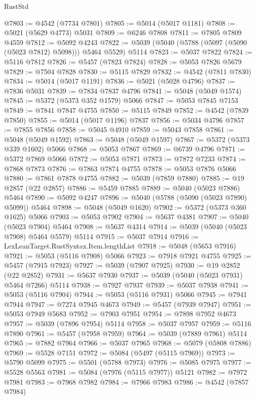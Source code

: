\begin{lexlean}{RustStd}
\begin{coremodule}
@7803 := @4542 (@7734 @7801)
@7805 := @5014 (@5017 @1181)
@7808 := @5021 (@5629 @4773) @5031
@7809 := @6246 @7808
@7811 := @7805 @7809 @4559
@7812 := @5092 @4243
@7822 := @5039 (@5040 (@5788 (@5097 (@5090 (@5023 @7812) @5098))) @5464 @5529) @5114
@7823 := @5037 @7822
@7824 := @5116 @7812
@7826 := @5457 (@7823 @7824)
@7828 := @5053 @7826 @5679
@7829 := @7504 @7828
@7830 := @5115 @7829
@7832 := @4542 (@7811 @7830)
@7834 := @5014 (@5017 @1191)
@7836 := @5021 (@5028 @4796)
@7837 := @7836 @5031
@7839 := @7834 @7837 @4796
@7841 := @5048 (@5049 @1574)
@7845 := @5372 (@5373 @352 @1579) @5066
@7847 := @5053 @7845 @7153
@7849 := @7841 @7847 @4755
@7850 := @5115 @7849
@7852 := @4542 (@7839 @7850)
@7855 := @5014 (@5017 @1196) @7837
@7856 := @5034 @4796
@7857 := @7855 @7856
@7858 := @5045 @4910
@7859 := @5043 @7858
@7861 := @5048 (@5049 @1592)
@7863 := @5048 (@5049 @1597)
@7867 := @5372 (@5373 @339 @1602) @5066
@7868 := @5053 @7867
@7869 := @6739 @4796
@7871 := @5372 @7869 @5066
@7872 := @5053 @7871
@7873 := @7872 @7233
@7874 := @7868 @7873
@7876 := @7863 @7874 @4755
@7878 := @5053 @7876 @5066
@7880 := @7861 @7878 @4755
@7882 := @5039 (@7859 @7880)
@7885 := @19 @2857 (@22 @2857)
@7886 := @5459 @7885
@7889 := @5040 (@5023 @7886) @5464
@7890 := @5092 @4247
@7896 := @5040 (@5788 (@5090 (@5023 @7890) @5099)) @5464
@7898 := @5048 (@5049 @1620)
@7902 := @5372 (@5373 @360 @1625) @5066
@7903 := @5053 @7902
@7904 := @5637 @4381
@7907 := @5040 (@5023 @7904) @5464
@7908 := @5637 @4314
@7914 := @5039 (@5040 (@5023 @7908) @5464 @5579) @5114
@7915 := @5037 @7914
@7916 := LexLeanTarget.RustSyntax.Item.lengthList
@7918 := @5048 (@5653 @7916)
@7921 := @5053 (@5116 @7908) @5066
@7923 := @7918 @7921 @4755
@7925 := @5457 (@7915 @7923)
@7927 := @5039 (@7907 @7925)
@7930 := @19 @2852 (@22 @2852)
@7931 := @5637 @7930
@7937 := @5039 (@5040 (@5023 @7931) @5464 @7266) @5114
@7938 := @7927 @7937
@7939 := @5037 @7938
@7941 := @5053 (@5116 @7904)
@7944 := @5053 (@5116 @7931) @5066
@7945 := @7941 @7944
@7947 := @7274 @7945 @4673
@7949 := @5457 (@7939 @7947)
@7951 := @5053 @7949 @5683
@7952 := @7903 @7951
@7954 := @7898 @7952 @4673
@7957 := @5039 (@7896 @7954) @5114
@7958 := @5037 @7957
@7959 := @5116 @7890
@7961 := @5457 (@7958 @7959)
@7964 := @5039 (@7889 @7961) @5114
@7965 := @7882 @7964
@7966 := @5037 @7965
@7968 := @5079 (@5808 @7886)
@7969 := @5528 @7151
@7972 := @5084 (@5497 (@5115 @7969))
@7973 := @5790 @5099
@7975 := @5501 (@5788 @7973)
@7976 := @5085 @7975
@7977 := @5528 @5563
@7981 := @5084 (@7976 (@5115 @7977)) @5121
@7982 := @7972 @7981
@7983 := @7968 @7982
@7984 := @7966 @7983
@7986 := @4542 (@7857 @7984)

\end{coremodule}
\end{lexlean}
